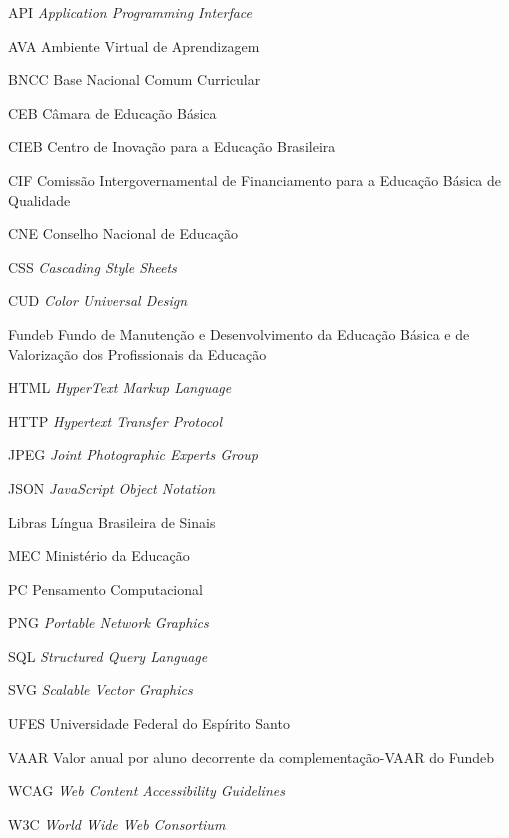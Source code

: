 \documentclass[
	12pt,				%
	openright,			%
	oneside,			%
	a4paper,			%
	english,			%
	french,				%
	spanish,			%
	brazil				%
	]{abntex2}
\begin{document}
\begin{siglas}
  \item[API] \textit{Application Programming Interface}
  \item[AVA] Ambiente Virtual de Aprendizagem
  \item[BNCC] Base Nacional Comum Curricular
  \item[CEB] Câmara de Educação Básica
  \item[CIEB] Centro de Inovação para a Educação Brasileira
  \item[CIF] Comissão Intergovernamental de Financiamento para a Educação Básica de Qualidade
  \item[CNE] Conselho Nacional de Educação
  \item[CSS] \textit{Cascading Style Sheets}
  \item[CUD] \textit{Color Universal Design}
  \item[Fundeb] Fundo de Manutenção e Desenvolvimento da Educação Básica e de Valorização dos Profissionais da Educação
  \item[HTML] \textit{HyperText Markup Language}
  \item[HTTP] \textit{Hypertext Transfer Protocol}
  \item[JPEG] \textit{Joint Photographic Experts Group}
  \item[JSON] \textit{JavaScript Object Notation}
  \item[Libras] Língua Brasileira de Sinais
  \item[MEC] Ministério da Educação
  \item[PC] Pensamento Computacional
  \item[PNG] \textit{Portable Network Graphics}
  \item[SQL] \textit{Structured Query Language}
  \item[SVG] \textit{Scalable Vector Graphics}
  \item[UFES] Universidade Federal do Espírito Santo
  \item[VAAR] Valor anual por aluno decorrente da complementação-VAAR do Fundeb
  \item[WCAG] \textit{Web Content Accessibility Guidelines}
  \item[W3C] \textit{World Wide Web Consortium}
\end{siglas}

\tableofcontents*
\cleardoublepage
\end{document}
